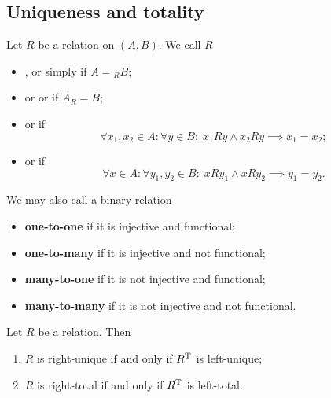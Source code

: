 \subsection{Uniqueness and totality}
\begin{definition}
Let $R$ be a relation on $(A, B)$. We call $R$
\begin{itemize}
\item {},  or simply  if $A = {_RB}$;
\item {} or  or  if $A_R = B$;
\item {} or  if
\[ \forall x_1,x_2\in A: \forall y\in B: \; x_1Ry \land x_2Ry \implies x_1=x_2; \]
\item {} or  if
\[ \forall x\in A: \forall y_1,y_2\in B: \; xRy_1 \land xRy_2 \implies y_1=y_2. \]
\end{itemize}
We may also call a binary relation
\begin{itemize}
\item \textbf{one-to-one} if it is injective and functional;
\item \textbf{one-to-many} if it is injective and not functional;
\item \textbf{many-to-one} if it is not injective and functional;
\item \textbf{many-to-many} if it is not injective and not functional.
\end{itemize}
\end{definition}

\begin{lemma}
Let $R$ be a relation. Then
\begin{enumerate}
\item $R$ is right-unique \textup{if and only if} $R^{\mathrm{T}}$ is left-unique;
\item $R$ is right-total \textup{if and only if} $R^{\mathrm{T}}$ is left-total.
\end{enumerate}
\end{lemma}

